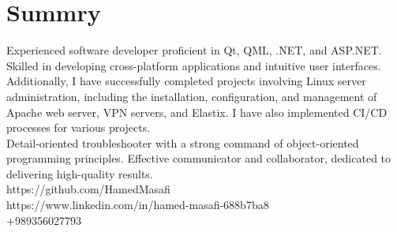 \section{Summry}
Experienced software developer proficient in Qt, QML, .NET, and ASP.NET. Skilled in developing cross-platform applications and intuitive user interfaces. Additionally, I have successfully completed projects involving Linux server administration, including the installation, configuration, and management of Apache web server, VPN servers, and Elastix. I have also implemented CI/CD processes for various projects.
\\
Detail-oriented troubleshooter with a strong command of object-oriented programming principles. Effective communicator and collaborator, dedicated to delivering high-quality results.
\\
\faGithub https://github.com/HamedMasafi
\\
\faLinkedin https://www.linkedin.com/in/hamed-masafi-688b7ba8
\\
\faPhone +989356027793
